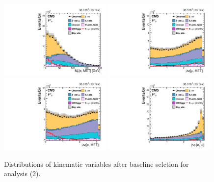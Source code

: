 \begin{figure}[!htpb]\centering
 \includegraphics[width=0.49\textwidth]{plots_and_figures/chapter5/preselection/Figure_002-e.pdf}
 \includegraphics[width=0.49\textwidth]{plots_and_figures/chapter5/preselection/Figure_002-f.pdf} \\
 \includegraphics[width=0.49\textwidth]{plots_and_figures/chapter5/preselection/Figure_002-g.pdf}
 \includegraphics[width=0.49\textwidth]{plots_and_figures/chapter5/preselection/Figure_002-h.pdf}
\caption{Distributions of kinematic variables after baseline selction for \hmue analysis (2).}
 \label{fig:h125_presel2}
\end{figure}


